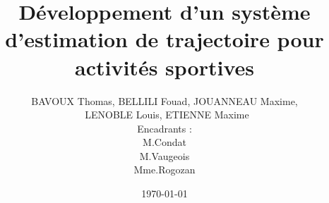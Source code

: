 \usepackage[utf8]{inputenc}
\usepackage[T1]{fontenc}
\usepackage[french]{babel}
\usepackage{geometry}
\geometry{margin=2.5cm}
\usepackage{graphicx}
\usepackage{amsmath, amssymb}
\usepackage{hyperref}
\usepackage{float}
\usepackage{caption}
\usepackage{subcaption}
\usepackage{listings}
\usepackage{fancyhdr}
\setlength{\footskip}{40pt}

\pagestyle{fancy}
\fancyhf{}
\fancyfoot[R]{\thepage}


\title{Développement d’un système d’estimation de trajectoire pour activités sportives}
\author{BAVOUX Thomas, BELLILI Fouad, JOUANNEAU Maxime, \\ LENOBLE Louis, ETIENNE Maxime \\
        Encadrants :\\ M.Condat \\ M.Vaugeois \\ Mme.Rogozan }
\date{\today}
